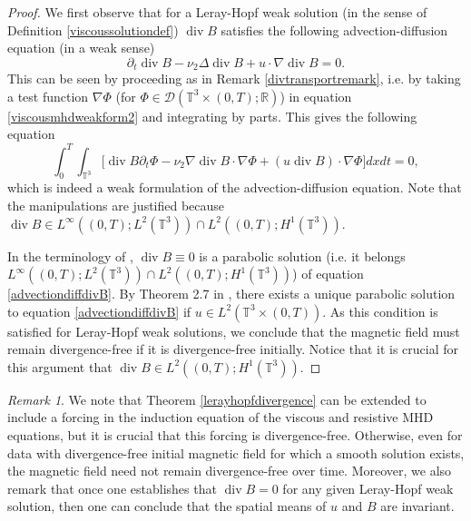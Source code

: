 \documentclass[12pt,a4paper]{article}
\theoremstyle{definition}
\theoremstyle{remark}
\newtheorem{remark}[theorem]{Remark}
\numberwithin{equation}{section}
\DeclareMathOperator{\Div}{div}
\begin{document}
\begin{proof}
We first observe that for a Leray-Hopf weak solution (in the sense of Definition \ref{viscoussolutiondef}) $\Div B$ satisfies the following advection-diffusion equation (in a weak sense)
\begin{equation} \label{advectiondiffdivB}
\partial_t \Div B - \nu_2 \Delta \Div B + u \cdot \nabla \Div B = 0.
\end{equation}
This can be seen by proceeding as in Remark \ref{divtransportremark}, i.e. by taking a test function $\nabla \Phi$ (for $\Phi \in \mathcal{D} (\mathbb{T}^3 \times (0,T); \mathbb{R})$) in equation \eqref{viscousmhdweakform2} and integrating by parts. This gives the following equation
\begin{equation*}
\int_0^T \int_{\mathbb{T}^3} \bigg[ \Div B \partial_t \Phi - \nu_2 \nabla \Div B \cdot \nabla \Phi + (u \Div B) \cdot \nabla \Phi \bigg] dx dt = 0,
\end{equation*}
which is indeed a weak formulation of the advection-diffusion equation. Note that the manipulations are justified because $\Div B \in L^\infty ((0,T);L^2 (\mathbb{T}^3)) \cap L^2 ((0,T);H^1(\mathbb{T}^3))$. 

In the terminology of \cite{bonicatto2023}, $\Div B \equiv 0$ is a parabolic solution (i.e. it belongs $L^\infty ((0,T);L^2 (\mathbb{T}^3)) \cap L^2 ((0,T);H^1(\mathbb{T}^3))$) of equation \eqref{advectiondiffdivB}. By Theorem 2.7 in \cite{bonicatto2023}, there exists a unique parabolic solution to equation \eqref{advectiondiffdivB} if $u \in L^2 (\mathbb{T}^3 \times (0,T))$. As this condition is satisfied for Leray-Hopf weak solutions, we conclude that the magnetic field must remain divergence-free if it is divergence-free initially. Notice that it is crucial for this argument that $\Div B \in L^2 ((0,T); H^1 (\mathbb{T}^3))$.
\end{proof}
\begin{remark}
We note that Theorem \ref{lerayhopfdivergence} can be extended to include a forcing in the induction equation of the viscous and resistive MHD equations, but it is crucial that this forcing is divergence-free. Otherwise, even for data with divergence-free initial magnetic field for which a smooth solution exists, the magnetic field need not remain divergence-free over time. Moreover, we also remark that once one establishes that $\Div B = 0$ for any given Leray-Hopf weak solution, then one can conclude that the spatial means of $u$ and $B$ are invariant.
\end{remark}
\end{document}
